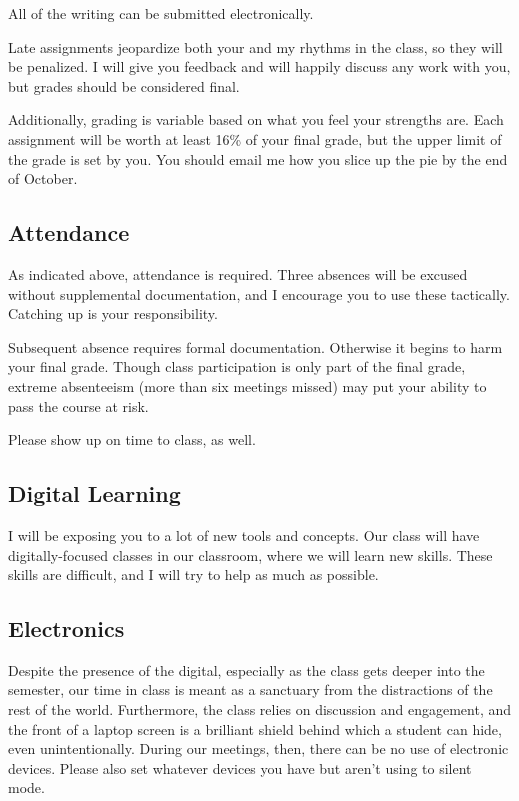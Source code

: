 All of the writing can be submitted electronically.

Late assignments jeopardize both your and my rhythms in the class, so they will
be penalized. I will give you feedback and will happily discuss any work with
you, but grades should be considered final.

Additionally, grading is variable based on what you feel your strengths are.
Each assignment will be worth at least 16\% of your final grade, but the upper
limit of the grade is set by you. You should email me how you slice up the pie
by the end of October.

\subsection{Attendance}
\label{attendance}

As indicated above, attendance is required. Three absences will be excused
without supplemental documentation, and I encourage you to use these
tactically. Catching up is your responsibility.

Subsequent absence requires formal documentation. Otherwise it begins to harm
your final grade. Though class participation is only part of the final grade,
extreme absenteeism (more than six meetings missed) may put your ability to
pass the course at risk.

Please show up on time to class, as well.

\subsection{Digital Learning}
\label{digitallearning}

I will be exposing you to a lot of new tools and concepts. Our class will have
digitally-focused classes in our classroom, where we will learn new skills.
These skills are difficult, and I will try to help as much as possible.

\subsection{Electronics}
\label{electronics}

Despite the presence of the digital, especially as the class gets deeper into
the semester, our time in class is meant as a sanctuary from the distractions
of the rest of the world. Furthermore, the class relies on discussion and
engagement, and the front of a laptop screen is a brilliant shield behind which
a student can hide, even unintentionally. During our meetings, then, there can
be no use of electronic devices. Please also set whatever devices you have but
aren’t using to silent mode.

